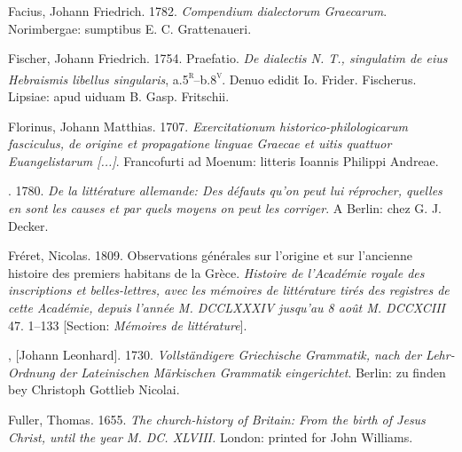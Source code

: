 \begin{styleStandard}
Facius, Johann Friedrich. 1782. \textit{Compendium dialectorum Graecarum}. Norimbergae: sumptibus E. C. Grattenaueri.
\end{styleStandard}

\begin{styleStandard}
Fischer, Johann Friedrich. 1754. Praefatio. \textit{De dialectis N. T., singulatim de eius Hebraismis libellus singularis}, a.5\textsc{\textsuperscript{r}}–b.8\textsc{\textsuperscript{v}}. Denuo edidit Io. Frider. Fischerus. Lipsiae: apud uiduam B. Gasp. Fritschii.
\end{styleStandard}

\begin{styleStandard}
Florinus, Johann Matthias. 1707. \textit{Exercitationum historico-philologicarum fasciculus, de origine et propagatione linguae Graecae et uitis quattuor Euangelistarum [...]}. Francofurti ad Moenum: litteris Ioannis Philippi Andreae.
\end{styleStandard}

\begin{styleStandard}
. 1780. \textit{De la littérature allemande: Des défauts qu’on peut lui réprocher, quelles en sont les causes et par quels moyens on peut les corriger}. A Berlin: chez G. J. Decker.
\end{styleStandard}

\begin{styleStandard}
Fréret, Nicolas. 1809. Observations générales sur l’origine et sur l’ancienne histoire des premiers habitans de la Grèce. \textit{Histoire de l’Académie royale des inscriptions et belles-lettres, avec les mémoires de littérature tirés des registres de cette Académie, depuis l’année M. DCCLXXXIV jusqu’au 8 août M. DCCXCIII} 47. 1–133 [Section: \textit{Mémoires de littérature}].
\end{styleStandard}

\begin{styleStandard}
[Frisch], [Johann Leonhard]. 1730. \textit{Vollständigere Griechische Grammatik, nach der Lehr-Ordnung der Lateinischen Märkischen Grammatik eingerichtet}. Berlin: zu finden bey Christoph Gottlieb Nicolai.
\end{styleStandard}

\begin{styleStandard}
Fuller, Thomas. 1655. \textit{The church-history of Britain: From the birth of Jesus Christ, until the year M. DC. XLVIII.} London: printed for John Williams.
\end{styleStandard}

